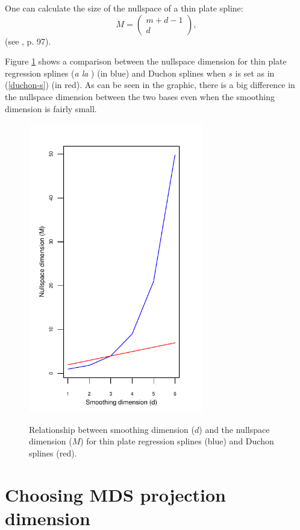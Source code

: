One can calculate the size of the nullspace of a thin plate spline:
\begin{equation*}
M=\begin{pmatrix} m+d-1 \\ d  \end{pmatrix},
\end{equation*}
(see \cite{wood2003}, p. 97).

Figure \ref{nullspace-dim} shows a comparison between the nullspace dimension for thin plate regression splines (\textit{a la} \cite{wood2003}) (in blue) and Duchon splines when $s$ is set as in (\ref{duchon-s}) (in red). As can be seen in the graphic, there is a big difference in the nullspace dimension between the two bases even when the smoothing dimension is fairly small.

\begin{figure}
\centering
\includegraphics[width=3in]{mds/figs/nullspace-dim.pdf} \\
\caption{Relationship between smoothing dimension ($d$) and the nullspace dimension ($M$) for thin plate regression splines (blue) and Duchon splines (red).}
\label{nullspace-dim}
\end{figure}

\section{Choosing MDS projection dimension}

